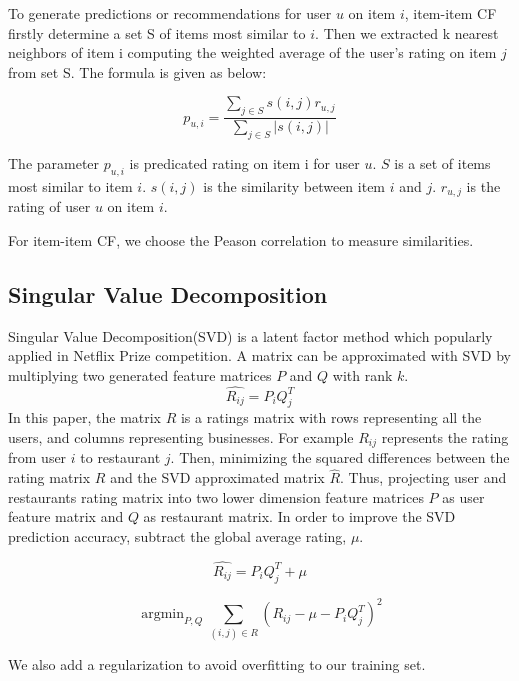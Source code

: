 \documentclass{llncs}
\DeclareMathOperator*{\argmin}{argmin}
\begin{document}
To generate predictions or recommendations for user $u$ on item $i$, item-item CF firstly determine a set S of items most similar to $i$. Then we extracted k nearest neighbors of item i computing the weighted average of the user's rating on item $j$ from set S. The formula is given as below:

\begin{equation}
p_{u,i} =\frac
{\sum\nolimits_{j \in S} s(i,j)r_{u,j}} 
{\sum\nolimits_{j \in S} |s(i,j)|}
\end{equation}

The parameter $p_{u,i}$ is predicated rating on item i for user $u$. $S$ is a set of items most similar to item $i$. $s(i,j)$ is the similarity between item $i$ and $j$. $r_{u,j}$ is the rating of user $u$ on item $i$.

For item-item CF, we choose the Peason correlation to measure similarities. 


\subsection{Singular Value Decomposition}
Singular Value Decomposition(SVD) is a latent factor method which popularly applied in Netflix Prize competition. A matrix can be approximated with SVD by multiplying two generated feature matrices $P$ and $Q$ with rank $k$.
\begin{equation}
\hat{R_{ij}} = P_iQ_{j}^{T}
\end{equation}
In this paper, the matrix $R$ is a ratings matrix with rows representing all the users, and columns representing businesses. For example $R_{ij}$ represents the rating from user $i$ to restaurant $j$. Then, minimizing the squared differences between the rating matrix $R$ and the SVD approximated matrix $\hat{R}$. Thus, projecting user and restaurants rating matrix into two lower dimension feature matrices $P$ as user feature matrix and $Q$ as restaurant matrix. In order to improve the SVD prediction accuracy, subtract the global average rating, $\mu$.

\begin{equation}
\hat{R_{ij}} = P_iQ_{j}^{T} + \mu
\end{equation}

\begin{equation}
\argmin_{P,Q}\sum_{(i,j)\in{R}}{(R_{ij} - \mu - P_iQ_{j}^{T})}^2
\end{equation}

We also add a regularization to avoid overfitting to our training set.
\end{document}
